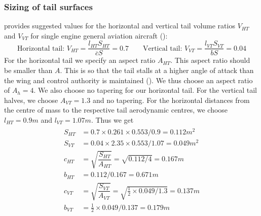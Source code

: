 \subsubsection{Sizing of tail surfaces}
\cite{raymer} provides suggested values for the horizontal and vertical tail volume ratios $V_{HT}$ and $V_{VT}$ for single engine general aviation aircraft (\cite[p. 112]{raymer}):
\begin{equation}
  \text{Horizontal tail: } V_{HT}=\dfrac{l_{HT}S_{HT}}{\overline{c}S}=0.7 \qquad \text{Vertical tail: } V_{VT}=\dfrac{l_{VT}S_{VT}}{bS}=0.04
\end{equation}
For the horizontal tail we specify an aspect ratio $A_{HT}$. This aspect ratio should be smaller than $A$. This is so that the tail stalls at a higher angle of attack than the wing and control authority is maintained (\cite[p. 438]{anderson}). We thus choose an aspect ratio of $A_h=4$. We also choose no tapering for our horizontal tail. For the vertical tail halves, we choose $A_{VT}=1.3$ and no tapering. For the horizontal distances from the centre of mass to the respective tail aerodynamic centres, we choose $l_{HT}=0.9\si{m}$ and $l_{VT}=1.07\si{m}$. Thus we get
\begin{align}
  \begin{split}
    S_{HT}&=0.7\times 0.261\times 0.553/0.9=0.112\si{m^2} \\
    S_{VT}&=0.04\times 2.35\times 0.553/1.07=0.049\si{m^2} \\
    c_{HT}&=\sqrt{\dfrac{S_{HT}}{A_{HT}}}=\sqrt{0.112/4}=0.167\si{m} \\
    b_{HT}&=0.112/0.167=0.671\si{m} \\
    c_{VT}&=\sqrt{\dfrac{S_{VT}}{A_{VT}}}=\sqrt{\frac{1}{2}\times 0.049/1.3}=0.137\si{m} \\
    b_{VT}&=\frac{1}{2}\times 0.049/0.137=0.179\si{m} \\
  \end{split}
\end{align}

